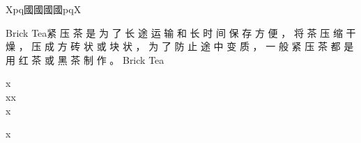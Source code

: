 

\begin{multicols}{3}
Xpq{\cn{}國國國國}pqX

Brick Tea{\cn{}紧    压 茶 是 为 了 长 途 运 输 和 长 时 间 保 存 方 便 ， 将 茶 压 缩 干 燥 ， 压 成 方 砖 状 或 块 状 ， 为 了 防 止 途 中 变 质 ， 一 般 紧 压 茶 都 是 用 红 茶 或 黑 茶 制 作 。
}Brick Tea
\end{multicols}

%
%
%
%
%
%
%
%
%
%
%
%



%
%

x\\
xx\\
xx
